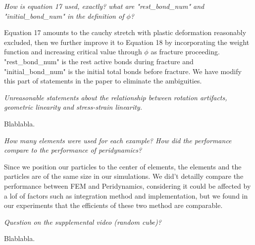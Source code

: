 \emph{How is equation 17 used, exactly? what are "rest\_bond\_num" and "initial\_bond\_num" in the definition of $\phi$?}

Equation 17 amounts to the cauchy stretch with plastic deformation reasonably excluded, then we further improve it to Equation 18 by incorporating the weight function and increasing critical value through $\phi$ as fracture proceeding. "rest\_bond\_num" is the rest active bonds during fracture and "initial\_bond\_num" is the initial total bonds before fracture. We have modify this part of statements in the paper to eliminate the ambiguities.

\emph{Unreasonable statements about the relationship between rotation artifacts, geometric linearity and stress-strain linearity.}

Blablabla.

\emph{How many elements were used for each example? How did the performance compare to the performance of peridynamics?}

Since we position our particles to the center of elements, the elements and the particles are of the same size in our simulations.
We did't detailly compare the performance between FEM and Peridynamics, considering it could be affected by a lof of factors such as integration method and implementation, but we found in our experiments that the efficients of these two method are comparable.

\emph{Question on the supplemental video (random cube)?}

Blablabla.


%





